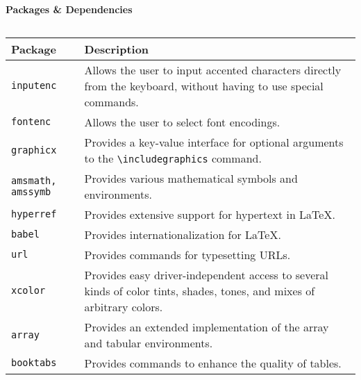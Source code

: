 \documentclass[11pt]{article}
\begin{document}
	\textbf{Packages \& Dependencies}
	\ifpdftex
		\begin{phantom}
			\begin{verbatim}
			\end{verbatim}
		\end{phantom}
	\fi
		

	\noindent\begin{tabularx}{\linewidth}{|X|X|}
		\hline
		\textbf{Package}        & \textbf{Description}                                                                                                   \\
		\hline
		\verb|inputenc|         & Allows the user to input accented characters directly from the keyboard, without having to use special commands.       \\
		\hline
		\verb|fontenc|          & Allows the user to select font encodings.                                                                              \\
		\hline
		\verb|graphicx|         & Provides a key-value interface for optional arguments to the \verb|\includegraphics| command.                          \\
		\hline
		\verb|amsmath, amssymb| & Provides various mathematical symbols and environments.                                                                \\
		\hline
		\verb|hyperref|         & Provides extensive support for hypertext in LaTeX.                                                                     \\
		\hline
		\verb|babel|            & Provides internationalization for LaTeX.                                                                               \\
		\hline
		\verb|url|              & Provides commands for typesetting URLs.                                                                                \\
		\hline
		\verb|xcolor|           & Provides easy driver-independent access to several kinds of color tints, shades, tones, and mixes of arbitrary colors. \\
		\hline
		\verb|array|            & Provides an extended implementation of the array and tabular environments.                                             \\
		\hline
		\verb|booktabs|         & Provides commands to enhance the quality of tables.                                                                    \\

\end{tabularx}
\end{document}
